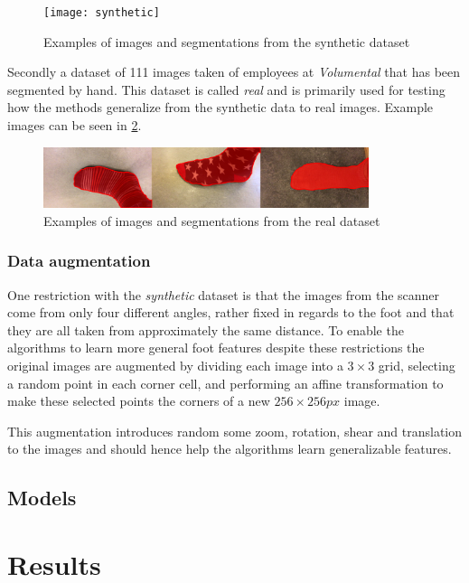 \documentclass{kththesis}
\begin{document}
\begin{figure}[h]
  \centering
  \texttt{[image: synthetic]}
  \caption{Examples of images and segmentations from the synthetic dataset}
  \label{fig:data_synthetic}
\end{figure}

Secondly a dataset of 111 images taken of employees at \textit{Volumental} that
has been segmented by hand. This dataset is called \textit{real} and is
primarily used for testing how the methods generalize from  the synthetic data to
real images. Example images can be seen in \cref{fig:data_real}.

\begin{figure}[h]
  \centering
  \includegraphics[width=0.85\textwidth]{real}
  \caption{Examples of images and segmentations from the real dataset}
  \label{fig:data_real}
\end{figure}

\subsection{Data augmentation}
One restriction with the \textit{synthetic} dataset is that the images from the
scanner come from only four different angles, rather fixed in regards to the
foot and that they are all taken from approximately the same
distance. To enable the algorithms to learn more general foot features despite
these restrictions the original images are augmented by dividing each image into
a \(3\times3\) grid, selecting a random point in each corner cell, and
performing an affine transformation to make these selected points the corners of
a new \(256\times256 \textit{px}\) image.

This augmentation introduces random some zoom, rotation, shear and translation
to the images and should hence help the algorithms learn generalizable features.

\section{Models}

\chapter{Results}
\end{document}
